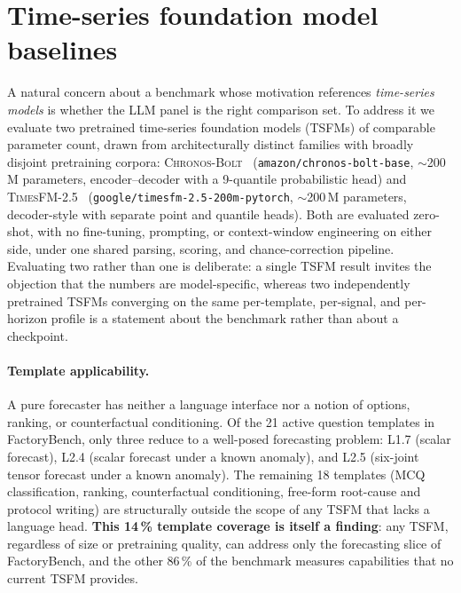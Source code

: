\section{Time-series foundation model baselines}
\label{app:chronos-baseline}

A natural concern about a benchmark whose motivation references \emph{time-series models} is whether the LLM panel is the right comparison set. To address it we evaluate two pretrained time-series foundation models (TSFMs) of comparable parameter count, drawn from architecturally distinct families with broadly disjoint pretraining corpora: \textsc{Chronos-Bolt}~\cite{ansari2024chronos} (\texttt{amazon/chronos-bolt-base}, $\sim$200\,M parameters, encoder--decoder with a 9-quantile probabilistic head) and \textsc{TimesFM-2.5}~\cite{das2024decoder} (\texttt{google/timesfm-2.5-200m-pytorch}, $\sim$200\,M parameters, decoder-style with separate point and quantile heads). Both are evaluated zero-shot, with no fine-tuning, prompting, or context-window engineering on either side, under one shared parsing, scoring, and chance-correction pipeline. Evaluating two rather than one is deliberate: a single TSFM result invites the objection that the numbers are model-specific, whereas two independently pretrained TSFMs converging on the same per-template, per-signal, and per-horizon profile is a statement about the benchmark rather than about a checkpoint.

\paragraph{Template applicability.} A pure forecaster has neither a language interface nor a notion of options, ranking, or counterfactual conditioning. Of the 21 active question templates in FactoryBench, only three reduce to a well-posed forecasting problem: L1.7 (scalar forecast), L2.4 (scalar forecast under a known anomaly), and L2.5 (six-joint tensor forecast under a known anomaly). The remaining 18 templates (MCQ classification, ranking, counterfactual conditioning, free-form root-cause and protocol writing) are structurally outside the scope of any TSFM that lacks a language head. \textbf{This 14\,\% template coverage is itself a finding}: any TSFM, regardless of size or pretraining quality, can address only the forecasting slice of FactoryBench, and the other 86\,\% of the benchmark measures capabilities that no current TSFM provides.

